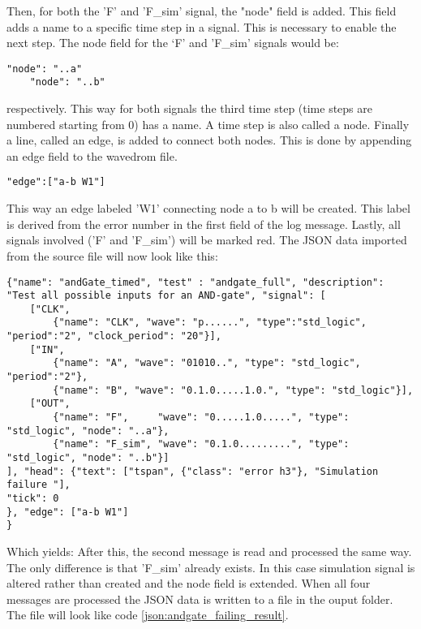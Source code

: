\npar
Then, for both the 'F' and 'F\_sim' signal, the "node" field is added. This field adds a name to a specific time step in a signal. This is necessary to enable the next step. The node field for the ‘F’ and 'F\_sim' signals would be:
\begin{lstlisting}[style=json]
	"node": "..a"
	"node": "..b"
\end{lstlisting}\noindent
respectively. This way for both signals the third time step (time steps are numbered starting from 0) has a name. A time step is also called a node.
\npar
Finally a line, called an edge, is added to connect both nodes. This is done by appending an edge field to the wavedrom file.
\begin{lstlisting}[style=json]
"edge":["a-b W1"]
\end{lstlisting}\noindent
This way an edge labeled 'W1' connecting node a to b will be created. This label is derived from the error number in the first field of the log message.
\npar
Lastly, all signals involved ('F' and 'F\_sim') will be marked red.
\npar
The JSON data imported from the source file will now look like this:
\begin{lstlisting}[style=json, caption={Temporary content of the result file of a failing AND-gate example}, label={json:andgate_failing_part}]
{"name": "andGate_timed", "test" : "andgate_full", "description": "Test all possible inputs for an AND-gate", "signal": [
	["CLK",
		{"name": "CLK", "wave": "p......", "type":"std_logic", "period":"2", "clock_period": "20"}],
	["IN",
		{"name": "A", "wave": "01010..", "type": "std_logic", "period":"2"},
		{"name": "B", "wave": "0.1.0.....1.0.", "type": "std_logic"}],
	["OUT",
		{"name": "F",     "wave": "0.....1.0.....", "type": "std_logic", "node": "..a"},
		{"name": "F_sim", "wave": "0.1.0.........", "type": "std_logic", "node": "..b"}]
], "head": {"text": ["tspan", {"class": "error h3"}, "Simulation failure "],
"tick": 0
}, "edge": ["a-b W1"]
}
\end{lstlisting}\nline
Which yields:
\nline
After this, the second message is read and processed the same way. The only difference is that 'F\_sim' already exists. In this case simulation signal is altered rather than created and the node field is extended.
\npar
When all four messages are processed the JSON data is written to a file in the  ouput folder. The file will look like code \ref{json:andgate_failing_result}.
